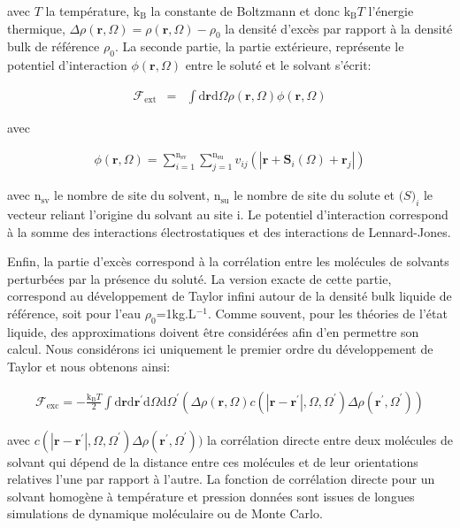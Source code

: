 avec $T$ la température, $\mathrm{k_B}$ la constante de Boltzmann et donc $\mathrm{k_B}T$ l'énergie thermique, $\Delta\rho\left(\boldsymbol{r},\Omega \right)=\rho\left(\boldsymbol{r},\Omega \right)-\rho_0$ la densité d'excès par rapport à la densité bulk de référence $\rho_0$. La seconde partie, la partie extérieure, représente le potentiel d'interaction $\phi\left(\boldsymbol{r},\Omega \right)$ entre le soluté et le solvant s'écrit:


\begin{eqnarray}
\mathcal{F}_\mathrm{ext}&=&\int\mathrm{d}\boldsymbol{r}\mathrm{d}\Omega\rho\left(\boldsymbol{r},\Omega \right)\phi\left(\boldsymbol{r},\Omega \right)
\end{eqnarray}

avec

\begin{eqnarray}
\phi\left(\boldsymbol{r},\Omega \right) = \sum\limits_{i=1}^{\mathrm{n}_\mathrm{sv}}\sum\limits_{j=1}^{\mathrm{n}_\mathrm{su}} v_{ij}(|\boldsymbol{r}+\boldsymbol{S}_i(\Omega)+\boldsymbol{r}_j|)
\end{eqnarray}

avec $\mathrm{n}_\mathrm{sv}$ le nombre de site du solvent, $\mathrm{n}_\mathrm{su}$ le nombre de site du solute et $\boldsymbol(S)_i$ le vecteur reliant l'origine du solvant au site i. Le potentiel d'interaction correspond à la somme des interactions électrostatiques et des interactions de Lennard-Jones. 

Enfin, la partie d'excès correspond à la corrélation entre les molécules de solvants perturbées par la présence du soluté. La version exacte de cette partie, correspond au développement de Taylor infini autour de la densité bulk liquide de référence, soit pour l'eau $\rho_0$=1kg.L$^{-1}$. Comme souvent, pour les théories de l'état liquide, des approximations doivent être considérées afin d'en permettre son calcul. Nous considérons ici uniquement le premier ordre du développement de Taylor et nous obtenons ainsi:

\begin{eqnarray}
\mathcal{F}_\mathrm{exc} = -\frac{\mathrm{k_B}T}{2}\int\mathrm{d}\boldsymbol{r}\mathrm{d}\boldsymbol{r}^\prime\mathrm{d}\Omega\mathrm{d}\Omega^\prime ( \Delta\rho\left( \boldsymbol{r}, \Omega   \right) c\left( \left|\boldsymbol{r}-\boldsymbol{r}^\prime\right|,\Omega,\Omega^\prime \right) \Delta\rho\left( \boldsymbol{r}^\prime, \Omega^\prime   \right) )
\end{eqnarray}

avec $c\left( \left|\boldsymbol{r}-\boldsymbol{r}^\prime\right|,\Omega,\Omega^\prime \right) \Delta\rho\left( \boldsymbol{r}^\prime, \Omega^\prime   \right) )$ la corrélation directe entre deux molécules de solvant qui dépend de la distance entre ces molécules et de leur orientations relatives l'une par rapport à l'autre. La fonction de corrélation directe pour un solvant homogène à température et pression données sont issues de longues simulations de dynamique moléculaire ou de Monte Carlo.

